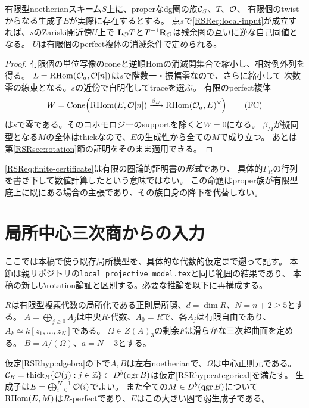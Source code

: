 \begin{proposition}[代数的proper族の有限trace証明書]\label{RSRprop:open}
有限型noetherianスキーム$S$上に、properなdg圏の族$\mathcal C_S$、$T$、$\mathcal O$、
有限個のtwistからなる生成子$E$が実際に存在するとする。
点$s$で\eqref{RSReq:local-input}が成立すれば、$s$のZariski開近傍$U$上で
$\mathbf L_{\mathcal O}T$と$T^{-1}\mathbf R_{\mathcal O}$は残余圏の互いに逆な自己同値となる。
$U$は有限個のperfect複体の消滅条件で定められる。
\end{proposition}
\begin{proof}
有限個の単位写像のconeと逆順Homの消滅開集合で縮小し、相対例外列を得る。
$L=\operatorname{RHom}(\mathcal O_a,\mathcal O[n])$は$s$で階数一・振幅零なので、さらに縮小して
次数零の線束となる。$s$の近傍で自明化してtraceを選ぶ。
有限のperfect複体
\[
 W=\operatorname{Cone}\!\left(\operatorname{RHom}(E,\mathcal O[n])
              \xrightarrow{\beta_E}\operatorname{RHom}(\mathcal O_a,E)^\vee\right)
 \tag{FC}\label{RSReq:finite-certificate}
\]
は$s$で零である。そのコホモロジーのsupportを除くと$W=0$になる。
$\beta_M$が擬同型となる$M$の全体はthickなので、$E$の生成性から全ての$M$で成り立つ。
あとは第\ref{RSRsec:rotation}節の証明をそのまま適用できる。
\end{proof}

\begin{remark}
\eqref{RSReq:finite-certificate}は有限の圏論的証明書の\emph{形式}であり、
具体的$\Gamma_R$の行列を書き下して数値計算したという意味ではない。
この命題はproper族が有限型底上に既にある場合の主張であり、その族自身の降下を代替しない。
\end{remark}

\section{局所中心三次商からの入力}\label{RSRsec:projective}
ここでは本稿で使う既存局所模型を、具体的な代数的仮定まで遡って記す。
本節は親リポジトリ\cite{RSRRepo}の\texttt{local\_projective\_model.tex}と同じ範囲の結果であり、
本稿の新しいrotation論証と区別する。必要な推論を以下に再構成する。

\begin{hypothesis}[次数別flatな局所量子化]\label{RSRhyp:algebra}
$R$は有限型複素代数の局所化である正則局所環、$d=\dim R$、$N=n+2\ge5$とする。
$A=\bigoplus_{j\ge0}A_j$は中央$R$-代数、$A_0=R$で、各$A_j$は有限自由であり、
$A_k\simeq k[z_1,\ldots,z_N]$である。
$\Omega\in Z(A)_3$の剰余$F$は滑らかな三次超曲面を定める。
$B=A/(\Omega)$、$a=N-3$とする。
\end{hypothesis}

\begin{proposition}[局所proper模型の入力検証]\label{RSRprop:local-model}
仮定\ref{RSRhyp:algebra}の下で$A,B$は左右noetherianで、$\Omega$は中心正則元である。
$\mathcal C_B=\operatorname{thick}_R\{\mathcal O(j):j\in\mathbb Z\}\subset D^b(\operatorname{qgr} B)$は仮定\ref{RSRhyp:categorical}を満たす。
生成子は$E=\bigoplus_{i=0}^{N-1}\mathcal O(i)$でよい。
また全ての$M\in D^b(\operatorname{qgr} B)$について$\operatorname{RHom}(E,M)$は$R$-perfectであり、$E$はこの大きい圏で弱生成子である。
\end{proposition}

